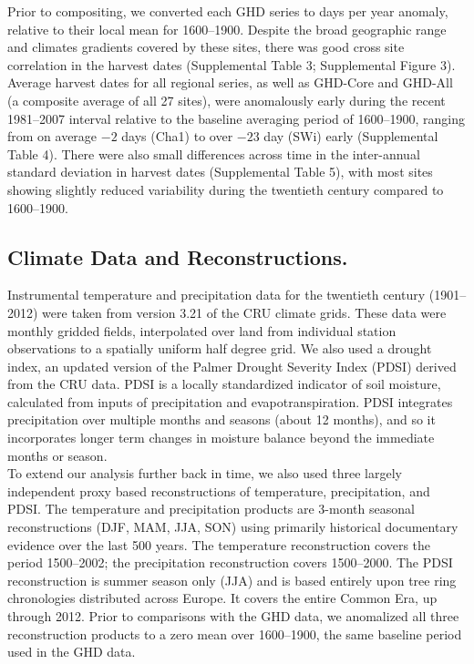 \documentclass[final]{nature}
\begin{document}
\begin{methods}
\indent Prior to compositing, we converted each GHD series to days per year anomaly, relative to their local mean for 1600--1900. Despite the broad geographic range and climates gradients covered by these sites, there was good cross site correlation in the harvest dates (Supplemental Table 3; Supplemental Figure 3). Average harvest dates for all regional series, as well as GHD-Core and GHD-All (a composite average of all 27 sites), were anomalously early during the recent 1981--2007 interval relative to the baseline averaging period of 1600--1900, ranging from on average $-2$ days (Cha1) to over $-23$ day (SWi) early (Supplemental Table 4). There were also small differences across time in the inter-annual standard deviation in harvest dates (Supplemental Table 5), with most sites showing slightly reduced variability during the twentieth century compared to 1600--1900.

\subsection{Climate Data and Reconstructions.}
\noindent Instrumental temperature and precipitation data for the twentieth century (1901--2012) were taken from version 3.21 of the CRU climate grids\cite{Harris2014}. These data were monthly gridded fields, interpolated over land from individual station observations to a spatially uniform half degree grid. We also used a drought index, an updated version of the Palmer Drought Severity Index (PDSI\cite{Palmer:1965}) derived from the CRU data\cite{Schrier2013}. PDSI is a locally standardized indicator of soil moisture, calculated from inputs of precipitation and evapotranspiration. PDSI integrates precipitation over multiple months and seasons (about 12 months), and so it incorporates longer term changes in moisture balance beyond the immediate months or season.\\
\indent To extend our analysis further back in time, we also used three largely independent proxy based reconstructions of temperature\cite{Luterbacher2004}, precipitation\cite{Pauling2006}, and PDSI\cite{CookOWDA2015}. The temperature and precipitation products are 3-month seasonal reconstructions (DJF, MAM, JJA, SON) using primarily historical documentary evidence over the last 500 years. The temperature reconstruction covers the period 1500--2002; the precipitation reconstruction covers 1500--2000. The PDSI reconstruction is summer season only (JJA) and is based entirely upon tree ring chronologies distributed across Europe. It covers the entire Common Era, up through 2012. Prior to comparisons with the GHD data, we anomalized all three reconstruction products to a zero mean over 1600--1900, the same baseline period used in the GHD data.


\end{methods}
\end{document}
